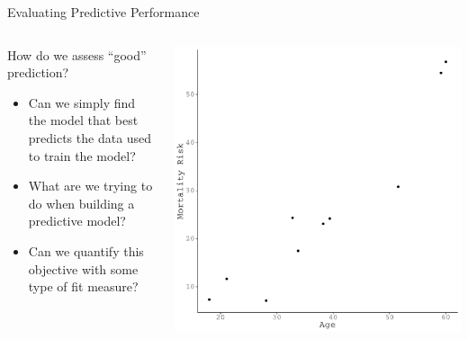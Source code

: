 \documentclass{beamer}\usepackage[]{graphicx}\usepackage[]{color}
\makeatletter
\def\maxwidth{ %
  \ifdim\Gin@nat@width>\linewidth
    \linewidth
  \else
    \Gin@nat@width
  \fi
}
\newenvironment{knitrout}{}{} %
\makeatother
\begin{document}

\begin{frame}{Evaluating Predictive Performance}
  
  \begin{columns}
    \begin{column}{0.5\textwidth}
      
      How do we assess ``good'' prediction?
      \vb
      \begin{itemize}
      \item Can we simply find the model that best predicts the data used to
        train the model?  
        \vb
      \item What are we trying to do when building a predictive model?  
        \vb
      \item Can we quantify this objective with some type of fit measure?
      \end{itemize}
  
      \end{column}
    
    \begin{column}{0.5\textwidth}
      
\begin{knitrout}\footnotesize
{}\color{fgcolor}

{\centering \includegraphics[width=\maxwidth]{figure/unnamed-chunk-9-1} 

}



\end{knitrout}

\end{column}
\end{columns}

\end{frame}
\end{document}

